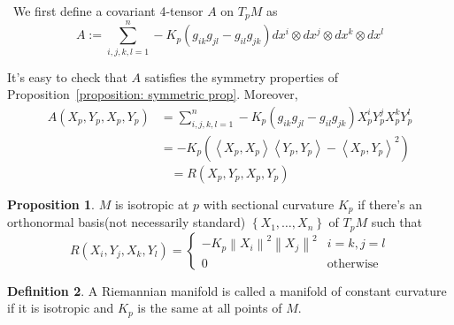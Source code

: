 \documentclass[12pt,a4paper]{book}
\newenvironment{prooff}{{\noindent\it\textcolor{cyan!40!black}{Proof}:}\,}{\par}
\newcommand{\bbrace}[1]{\left\{ #1 \right\} }
\theoremstyle{definition}
\newtheorem{defn}{Definition}[section]
\newtheorem{prop}[defn]{Proposition}
\begin{document}
\begin{prooff}
    We first define a covariant 4-tensor $A$ on $T_p M$ as
    $$
        A:=\sum_{i, j, k, l=1}^n-K_p\left(g_{i k} g_{j l}-g_{i l} g_{j k}\right) d x^i \otimes d x^j \otimes d x^k \otimes d x^l
    $$

    It's easy to check that $A$ satisfies the symmetry properties of Proposition~\ref{proposition: symmetric prop}. Moreover,
    $$
        \begin{aligned}
            A\left(X_p, Y_p, X_p, Y_p\right) & =\sum_{i, j, k, l=1}^n-K_p\left(g_{i k} g_{j l}-g_{i l} g_{j k}\right) X_p^i Y_p^j X_p^k Y_p^l                              \\
                                             & =-K_p\left(\left\langle X_p, X_p\right\rangle\left\langle Y_p, Y_p\right\rangle-\left\langle X_p, Y_p\right\rangle^2\right)
        \end{aligned}
    $$
    $$
        =R\left(X_p, Y_p, X_p, Y_p\right)
    $$
\end{prooff}
\begin{prop}
    $M$ is isotropic at $p$ with sectional curvature $K_p$ if
    there's an orthonormal basis(not necessarily standard) $\bbrace{X_1,\dots,X_n}$ of $T_pM$ such that
    \begin{equation*}
        R\left(X_i, Y_j, X_k, Y_l\right)=\begin{cases}
            -K_p \left\|X_i\right\|^2\left\|X_j\right\|^2 & i=k,j=l          \\
            0                                             & \text{otherwise}
        \end{cases}
    \end{equation*}
\end{prop}
\begin{defn}
    A Riemannian manifold is called a manifold of constant curvature if it is isotropic and $K_p$ is the same at all points of $M$.
\end{defn}
\end{document}
